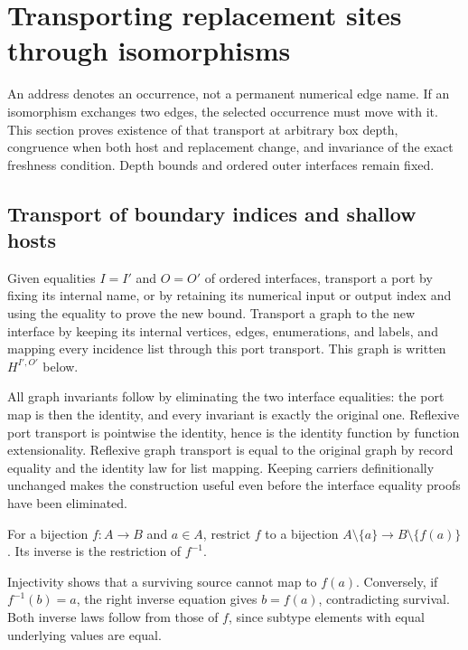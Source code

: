 \section{Transporting replacement sites through isomorphisms}
\label{sec:site-transport}

An address denotes an occurrence, not a permanent numerical edge name. If an
isomorphism exchanges two edges, the selected occurrence must move with it.
This section proves existence of that transport at arbitrary box depth,
congruence when both host and replacement change, and invariance of the exact
freshness condition. Depth bounds and ordered outer interfaces remain fixed.

\subsection{Transport of boundary indices and shallow hosts}

\begin{definition}\label{term:boundary-transport}
Given equalities $I=I'$ and $O=O'$ of ordered interfaces, transport a port by
fixing its internal name, or by retaining its numerical input or output index
and using the equality to prove the new bound. Transport a graph to the new
interface by keeping its internal vertices, edges, enumerations, and labels,
and mapping every incidence list through this port transport. This graph is
written $H^{I',O'}$ below.
\end{definition}
All graph invariants follow by eliminating the two interface equalities: the
port map is then the identity, and every invariant is exactly the original
one. Reflexive port transport is pointwise the identity, hence is the identity
function by function extensionality. Reflexive graph transport is equal to the
original graph by record equality and the identity law for list mapping.
Keeping carriers definitionally unchanged makes the construction useful even
before the interface equality proofs have been eliminated.

\begin{definition}\label{term:complement-restriction}
For a bijection $f:A\to B$ and $a\in A$, restrict $f$ to a bijection
$A\setminus\{a\}\to B\setminus\{f(a)\}$. Its inverse is the restriction of
$f^{-1}$.
\end{definition}
Injectivity shows that a surviving source cannot map to $f(a)$. Conversely, if
$f^{-1}(b)=a$, the right inverse equation gives $b=f(a)$, contradicting survival.
Both inverse laws follow from those of $f$, since subtype elements with equal
underlying values are equal.

